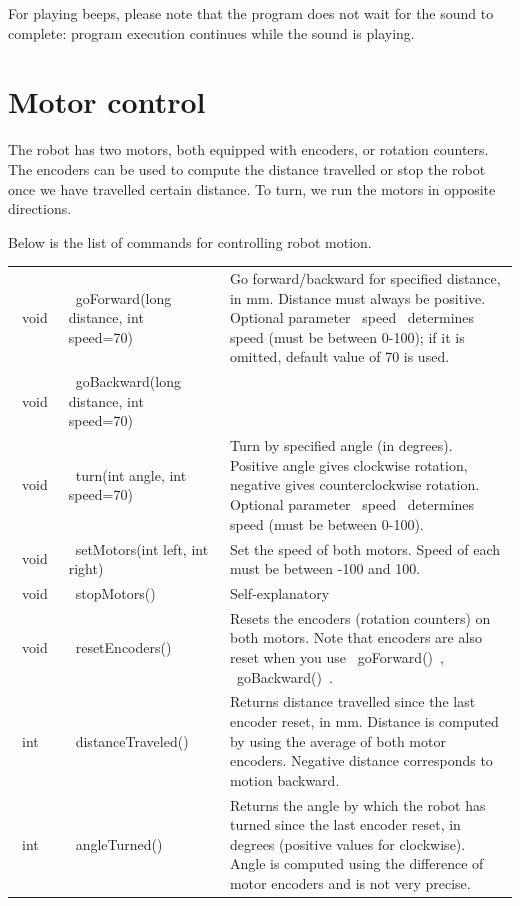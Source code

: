 \documentclass[oneside]{stml-l}
\numberwithin{figure}{chapter}
\begin{document}
For playing beeps, please note that the program does not wait for the sound to complete: 
program execution continues while the sound is playing. 


\section{Motor control}

The robot has two motors, both equipped with encoders, or rotation counters. 
The encoders can be used to compute the distance travelled or stop the robot 
once we have travelled certain distance. To turn, we run the motors in 
opposite directions. 

Below is the list of commands for controlling robot motion.
 
\par\noindent
\begin{tabular}{|l | l | p{7cm}|}
\hline 
~void~ & ~goForward(long distance, int speed=70)~ & Go forward/backward 
             for specified distance, in mm. Distance must always be positive. 
             Optional parameter ~speed~ determines speed (must be between 0-100); 
             if it is omitted, default value of 70 is used.
\\
\cline{1-2}
~void~ & ~goBackward(long distance, int speed=70)~ & \\
\hline
~void~ & ~turn(int angle, int speed=70)~ & Turn by specified angle (in degrees). 
                  Positive angle gives clockwise rotation, negative gives counterclockwise 
                  rotation. Optional parameter ~speed~ determines speed 
                  (must be between 0-100).
\\
\hline
~void~ &~setMotors(int left, int right)~ & Set the speed of both motors. 
                     Speed of each must be between -100 and 100.  \\
\hline
~void~ &~stopMotors()~ & Self-explanatory\\
\hline
~void~ &~resetEncoders()~ & Resets the encoders (rotation counters) on both motors. 
                      Note that encoders are also reset when you 
                      use ~goForward()~, ~goBackward()~. \\
\hline
~int~ & ~distanceTraveled()~& Returns distance travelled since the last 
                encoder reset, in mm. Distance is computed by using the average 
                of both motor encoders. Negative distance corresponds to motion backward. \\
\hline
~int~ & ~angleTurned()~& Returns the angle by which the robot has turned  since the last 
                encoder reset, in degrees (positive values for clockwise). Angle  is computed  
                using the difference of  motor encoders and is not very precise.  \\
\hline
\end{tabular}
\end{document}
